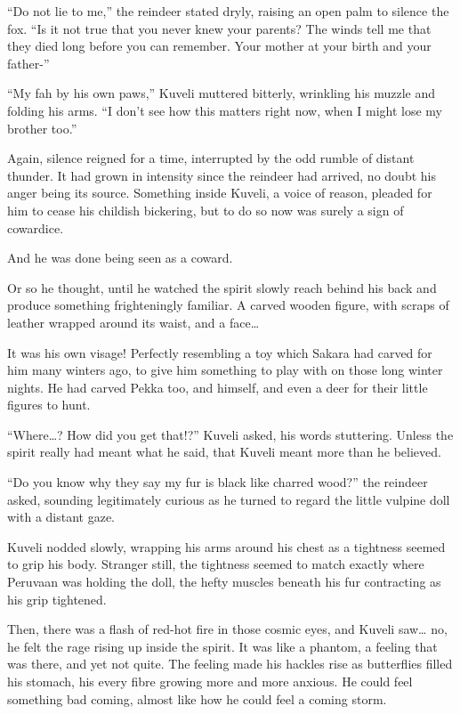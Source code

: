 ``Do not lie to me,'' the reindeer stated dryly, raising an open palm to silence the fox. ``Is it not true that you never knew your parents? The winds tell me that they died long before you can remember. Your mother at your birth and your father-''

``My fah by his own paws,'' Kuveli muttered bitterly, wrinkling his muzzle and folding his arms. ``I don't see how this matters right now, when I might lose my brother too.''

Again, silence reigned for a time, interrupted by the odd rumble of distant thunder. It had grown in intensity since the reindeer had arrived, no doubt his anger being its source. Something inside Kuveli, a voice of reason, pleaded for him to cease his childish bickering, but to do so now was surely a sign of cowardice.

And he was done being seen as a coward.

Or so he thought, until he watched the spirit slowly reach behind his back and produce something frighteningly familiar. A carved wooden figure, with scraps of leather wrapped around its waist, and a face\ldots{}

It was his own visage! Perfectly resembling a toy which Sakara had carved for him many winters ago, to give him something to play with on those long winter nights. He had carved Pekka too, and himself, and even a deer for their little figures to hunt.

``Where\ldots? How did you get that!?'' Kuveli asked, his words stuttering. Unless the spirit really had meant what he said, that Kuveli meant more than he believed.

``Do you know why they say my fur is black like charred wood?'' the reindeer asked, sounding legitimately curious as he turned to regard the little vulpine doll with a distant gaze.

Kuveli nodded slowly, wrapping his arms around his chest as a tightness seemed to grip his body. Stranger still, the tightness seemed to match exactly where Peruvaan was holding the doll, the hefty muscles beneath his fur contracting as his grip tightened.

Then, there was a flash of red-hot fire in those cosmic eyes, and Kuveli saw\ldots{} no, he felt the rage rising up inside the spirit. It was like a phantom, a feeling that was there, and yet not quite. The feeling made his hackles rise as butterflies filled his stomach, his every fibre growing more and more anxious. He could feel something bad coming, almost like how he could feel a coming storm.

